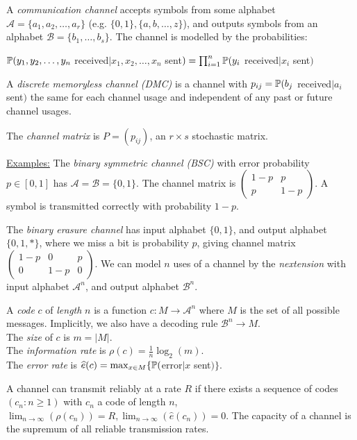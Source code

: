 \documentclass[10pt,a4paper]{article}
\begin{document}
A \emph{communication channel} accepts symbols from some alphabet $\mathcal{A} = \{a_1, a_2, \ldots, a_r\}$ (e.g. $\{0,1\}, \{a,b,\ldots,z\}$), and outputs symbols from an alphabet $\mathcal{B} = \{b_1, \ldots, b_s\}$. The channel is modelled by the probabilities:
\begin{center}$\P(y_1,y_2,\ldots,y_n$ received$| x_1,x_2,\ldots,x_n$ sent$) = \prod_{i=1}^{n} \P(y_i$ received$| x_i$ sent$)$\end{center}

A \emph{discrete memoryless channel (DMC)} is a channel with $p_{ij} = \P(b_j$ received$|a_i$ sent$)$ the same for each channel usage and independent of any past or future channel usages.

The \emph{channel matrix} is $P = (p_{ij})$, an $r \times s$ stochastic matrix.

\underline{Examples:} The \emph{binary symmetric channel (BSC)} with error probability $p \in [0,1]$ has $\mathcal{A} = \mathcal{B} = \{0,1\}$. The channel matrix is $\begin{pmatrix} 1-p & p \\ p & 1-p \end{pmatrix}$. A symbol is transmitted correctly with probability $1-p$.

The \emph{binary erasure channel} has input alphabet $\{0,1\}$, and output alphabet $\{0, 1, \ast\}$, where we miss a bit is probability $p$, giving channel matrix $\begin{pmatrix} 1-p & 0 & p \\ 0 & 1-p & 0\end{pmatrix}$. We can model $n$ uses of a channel by the \emph{n\th extension} with input alphabet $\mathcal{A}^n$, and output alphabet $\mathcal{B}^n$.

A \emph{code} $c$ of \emph{length} $n$ is a function $c: M \to \mathcal{A}^n$ where $M$ is the set of all possible messages. Implicitly, we also have a decoding rule $\mathcal{B}^n \to M$.\\
The \emph{size} of $c$ is $m = |M|$. \\
The \emph{information rate} is $\rho(c) = \frac{1}{n}\log_2(m)$. \\
The \emph{error rate} is $\hat{e}(c) = \max_{x\in M} \{\P($error$|x$ sent$)\}$.

A channel can transmit reliably at a rate $R$ if there exists a sequence of codes $(c_n: n\geq 1)$ with $c_n$ a code of length $n$, $\lim_{n\to \infty}(\rho(c_n)) =R, \lim_{n\to\infty}(\hat{e}(c_n)) = 0$. The capacity of a channel is the supremum of all reliable transmission rates.
\end{document}
